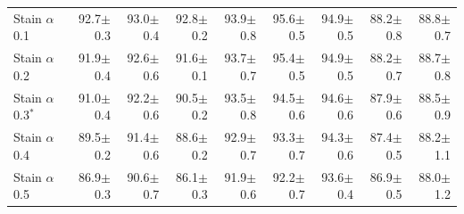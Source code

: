\begin{table}[H]
\begin{tabular}{lrrrrrrrr}
\addlinespace
Stain $\alpha$ 0.1 & 92.7{\scriptsize$\pm$0.3} & 93.0{\scriptsize$\pm$0.4} & 92.8{\scriptsize$\pm$0.2} & 93.9{\scriptsize$\pm$0.8} & 95.6{\scriptsize$\pm$0.5} & 94.9{\scriptsize$\pm$0.5} & 88.2{\scriptsize$\pm$0.8} & 88.8{\scriptsize$\pm$0.7} \\
Stain $\alpha$ 0.2 & 91.9{\scriptsize$\pm$0.4} & 92.6{\scriptsize$\pm$0.6} & 91.6{\scriptsize$\pm$0.1} & 93.7{\scriptsize$\pm$0.7} & 95.4{\scriptsize$\pm$0.5} & 94.9{\scriptsize$\pm$0.5} & 88.2{\scriptsize$\pm$0.7} & 88.7{\scriptsize$\pm$0.8} \\
Stain $\alpha$ 0.3$^{*}$ & 91.0{\scriptsize$\pm$0.4} & 92.2{\scriptsize$\pm$0.6} & 90.5{\scriptsize$\pm$0.2} & 93.5{\scriptsize$\pm$0.8} & 94.5{\scriptsize$\pm$0.6} & 94.6{\scriptsize$\pm$0.6} & 87.9{\scriptsize$\pm$0.6} & 88.5{\scriptsize$\pm$0.9} \\
Stain $\alpha$ 0.4 & 89.5{\scriptsize$\pm$0.2} & 91.4{\scriptsize$\pm$0.6} & 88.6{\scriptsize$\pm$0.2} & 92.9{\scriptsize$\pm$0.7} & 93.3{\scriptsize$\pm$0.7} & 94.3{\scriptsize$\pm$0.6} & 87.4{\scriptsize$\pm$0.5} & 88.2{\scriptsize$\pm$1.1} \\
Stain $\alpha$ 0.5 & 86.9{\scriptsize$\pm$0.3} & 90.6{\scriptsize$\pm$0.7} & 86.1{\scriptsize$\pm$0.3} & 91.9{\scriptsize$\pm$0.6} & 92.2{\scriptsize$\pm$0.7} & 93.6{\scriptsize$\pm$0.4} & 86.9{\scriptsize$\pm$0.5} & 88.0{\scriptsize$\pm$1.2} \\
\bottomrule
\end{tabular}
\end{table}

